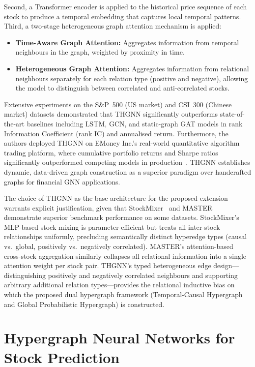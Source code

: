 \documentclass[a4paper,11pt]{report}
\begin{document}
Second, a Transformer encoder is applied to the historical price sequence of each stock to produce a temporal embedding that captures local temporal patterns. Third, a two-stage heterogeneous graph attention mechanism is applied:

\begin{itemize}
    \item \textbf{Time-Aware Graph Attention:} Aggregates information from temporal neighbours in the graph, weighted by proximity in time.
    \item \textbf{Heterogeneous Graph Attention:} Aggregates information from relational neighbours separately for each relation type (positive and negative), allowing the model to distinguish between correlated and anti-correlated stocks.
\end{itemize}

Extensive experiments on the S\&P~500 (US market) and CSI~300 (Chinese market) datasets demonstrated that THGNN significantly outperforms state-of-the-art baselines including LSTM, GCN, and static-graph GAT models in rank Information Coefficient (rank IC) and annualised return. Furthermore, the authors deployed THGNN on EMoney Inc.'s real-world quantitative algorithm trading platform, where cumulative portfolio returns and Sharpe ratios significantly outperformed competing models in production~\cite{xiang2022thgnn}. THGNN establishes dynamic, data-driven graph construction as a superior paradigm over handcrafted graphs for financial GNN applications.

The choice of THGNN as the base architecture for the proposed extension warrants explicit justification, given that StockMixer~\cite{fan2024stockmixer} and MASTER~\cite{li2024master} demonstrate superior benchmark performance on some datasets. StockMixer's MLP-based stock mixing is parameter-efficient but treats all inter-stock relationships uniformly, precluding semantically distinct hyperedge types (causal vs.\ global, positively vs.\ negatively correlated). MASTER's attention-based cross-stock aggregation similarly collapses all relational information into a single attention weight per stock pair. THGNN's typed heterogeneous edge design---distinguishing positively and negatively correlated neighbours and supporting arbitrary additional relation types---provides the relational inductive bias on which the proposed dual hypergraph framework (Temporal-Causal Hypergraph and Global Probabilistic Hypergraph) is constructed.
\section{Hypergraph Neural Networks for Stock Prediction}
\label{sec:hgnn}
\end{document}
